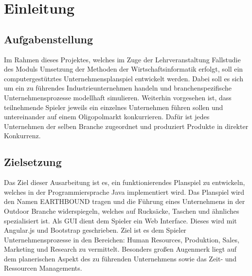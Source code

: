 \chapter{Einleitung}
\section{Aufgabenstellung}
Im Rahmen dieses Projektes, welches im Zuge der Lehrveranstaltung Fallstudie des Moduls Umsetzung der Methoden der Wirtschaftsinformatik erfolgt, soll ein computergestütztes Unternehmensplanspiel entwickelt werden. Dabei soll es sich um ein zu führendes Industrieunternehmen handeln und branchenspezifische Unternehmensprozesse modellhaft simulieren. Weiterhin vorgesehen ist, dass teilnehmende Spieler jeweils ein einzelnes Unternehmen führen sollen und untereinander auf einem Oligopolmarkt konkurrieren. Dafür ist jedes Unternehmen der selben Branche zugeordnet und produziert Produkte in direkter Konkurrenz.
\section{Zielsetzung}
Das Ziel dieser Ausarbeitung ist es, ein funktionierendes Planspiel zu entwickeln, welches in der Programmiersprache Java implementiert wird. Das Planspiel wird den Namen EARTHBOUND tragen und die Führung eines Unternehmens in der Outdoor Branche widerspiegeln, welches auf Rucksäcke, Taschen und ähnliches spezialisiert ist. Als GUI dient dem Spieler ein Web Interface. Dieses wird mit Angular.js und Bootstrap geschrieben. Ziel ist es dem Spieler Unternehmensprozesse in den Bereichen: Human Resources, Produktion, Sales, Marketing und Research zu vermittelt. Besonders großen Augenmerk liegt auf dem planerischen Aspekt des zu führenden Unternehmens sowie das Zeit- und Ressourcen Managements.
